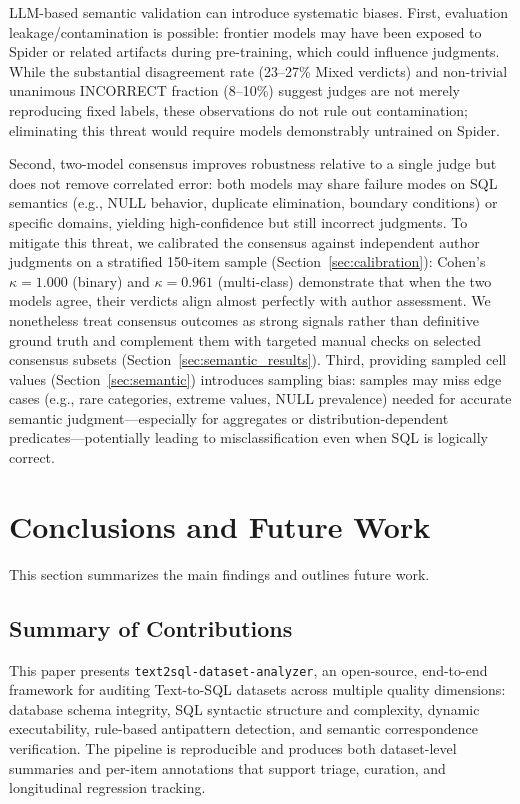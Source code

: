 \documentclass[print]{einformatica}
\begin{document}
LLM-based semantic validation can introduce systematic biases. First, evaluation leakage/contamination is possible: frontier models may have been exposed to Spider or related artifacts during pre-training, which could influence judgments. While the substantial disagreement rate (23--27\% Mixed verdicts) and non-trivial unanimous INCORRECT fraction (8--10\%) suggest judges are not merely reproducing fixed labels, these observations do not rule out contamination; eliminating this threat would require models demonstrably untrained on Spider.

Second, two-model consensus improves robustness relative to a single judge but does not remove correlated error: both models may share failure modes on SQL semantics (e.g., NULL behavior, duplicate elimination, boundary conditions) or specific domains, yielding high-confidence but still incorrect judgments. To mitigate this threat, we calibrated the consensus against independent author judgments on a stratified 150-item sample (Section~\ref{sec:calibration}): Cohen's $\kappa = 1.000$ (binary) and $\kappa = 0.961$ (multi-class) demonstrate that when the two models agree, their verdicts align almost perfectly with author assessment. We nonetheless treat consensus outcomes as strong signals rather than definitive ground truth and complement them with targeted manual checks on selected consensus subsets (Section~\ref{sec:semantic_results}). Third, providing sampled cell values (Section~\ref{sec:semantic}) introduces sampling bias: samples may miss edge cases (e.g., rare categories, extreme values, NULL prevalence) needed for accurate semantic judgment---especially for aggregates or distribution-dependent predicates---potentially leading to misclassification even when SQL is logically correct.

\section{Conclusions and Future Work}\label{sec:Conclusions}

This section summarizes the main findings and outlines future work.

\subsection{Summary of Contributions}

This paper presents \texttt{text2sql-dataset-analyzer}, an open-source, end-to-end framework for auditing Text-to-SQL datasets across multiple quality dimensions: database schema integrity, SQL syntactic structure and complexity, dynamic executability, rule-based antipattern detection, and semantic correspondence verification. The pipeline is reproducible and produces both dataset-level summaries and per-item annotations that support triage, curation, and longitudinal regression tracking.
\end{document}

